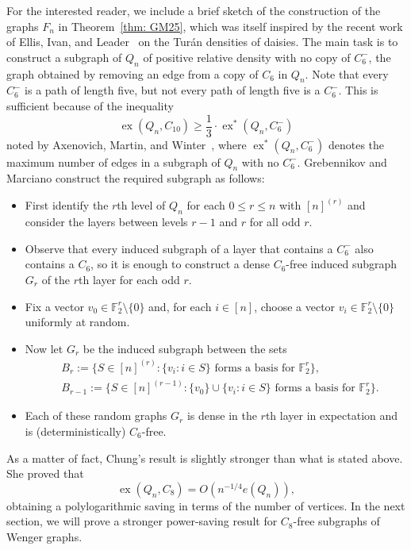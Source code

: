 \documentclass[A4paper,reqno,oneside,11pt]{amsart}
\theoremstyle{plain}
\theoremstyle{definition}
\newcommand{\F}{\mathbb{F}}
\newcommand{\ex}{\operatorname{ex}}
\begin{document}
For the interested reader, we include a brief sketch of the construction of the graphs $F_n$ in Theorem~\ref{thm: GM25}, which was itself inspired by the recent work of Ellis, Ivan, and Leader~\cite{EIL24} on the Tur\'an densities of daisies. The main task is to construct a subgraph of $Q_n$ of positive relative density with no copy of $C_6^-$, the graph obtained by removing an edge from a copy of $C_6$ in $Q_n$. Note that every $C_6^-$ is a path of length five, but not every path of length five is a $C_6^-$. 
This is sufficient because of the inequality
\begin{equation*}
    \ex(Q_n, C_{10}) \geq \frac{1}{3} \cdot \ex^*(Q_n,C_6^-)
\end{equation*}
noted by Axenovich, Martin, and Winter~\cite{AMW24},
where $\ex^*(Q_n,C_6^{-})$ denotes the maximum number of edges in a subgraph of $Q_n$ with no $C_6^-$.
Grebennikov and Marciano construct the required subgraph as follows:
\begin{itemize}
    \item First identify the $r$th level of $Q_n$ for each $0 \leq r \leq n$ with $[n]^{(r)}$ and consider the layers between levels $r-1$ and $r$ for all odd $r$.
    \item Observe that every induced subgraph of a layer that contains a $C_6^-$ also contains a $C_6$, so it is enough to construct a dense $C_6$-free induced subgraph $G_r$ of the $r$th layer for each odd $r$.
    \item Fix a vector $v_0 \in \F_2^r \setminus \{0\}$ and, for each $i \in [n]$, choose a vector $v_i \in \F_2^r \setminus \{0\}$ uniformly at random.
    \item Now let $G_r$ be the induced subgraph between the sets
    \begin{align*}
        & B_r := \{S \in [n]^{(r)}: \{v_i: i \in S\} \text{ forms a basis for } \F_2^r\},\\
        & B_{r-1} := \{S \in [n]^{(r-1)}: \{v_0\} \cup \{v_i: i \in S\} \text{ forms a basis for } \F_2^r\}.
    \end{align*}
    \item Each of these random graphs $G_r$ is dense in the $r$th layer in expectation and is (deterministically) $C_6$-free.
\end{itemize}

As a matter of fact, Chung's result is slightly stronger than what is stated above.
She proved that
\begin{equation*}
    \ex(Q_n, C_8) = O(n^{-1/4} e(Q_n)),
\end{equation*}
obtaining a polylogarithmic saving in terms of the number of vertices.
In the next section, we will prove a stronger power-saving result for $C_8$-free subgraphs of Wenger graphs.
\end{document}
